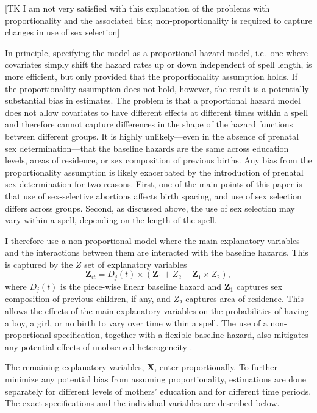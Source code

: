 \documentclass[12pt,letterpaper]{article}
\begin{document}
[TK I am not very satisfied with this explanation of the problems with
proportionality and the associated bias; non-proportionality is required
to capture changes in use of sex selection]

In principle, specifying the model as a proportional hazard model, i.e.\ one 
where covariates simply shift the hazard rates up or down independent of 
spell length, is more efficient, but only provided that the proportionality 
assumption holds.
If the proportionality assumption does not hold, however, the result is
a potentially substantial bias in estimates.
The problem is that a proportional hazard model does not allow covariates
to have different effects at different times within a spell and therefore
cannot capture differences in the shape of the hazard functions between 
different groups. 
It is highly unlikely---even in the absence of prenatal sex determination---that 
the baseline hazards are the same across education levels, areas of residence, 
or sex composition of previous births.
Any bias from the proportionality assumption is likely exacerbated by the 
introduction of prenatal sex determination for two reasons.
First, one of the main points of this paper is that use of sex-selective 
abortions affects birth spacing, and use of sex selection differs across groups.
Second, as discussed above, the use of sex selection may vary within a spell,
depending on the length of the spell.

I therefore use a non-proportional model where the main explanatory variables 
and the interactions between them are interacted with the baseline hazards.
This is captured by the $Z$ set of explanatory variables
\begin{equation}
 \mathbf{Z}_{it} = D_j(t) \times (\mathbf{Z}_1 + Z_2 + \mathbf{Z}_1 \times Z_2),
\end{equation}
where $D_j(t)$ is the piece-wise linear baseline hazard and $\mathbf{Z}_1$ captures sex 
composition of previous children, if any, and $Z_2$ captures area of residence.
This allows the effects of the main explanatory variables on the probabilities 
of having a boy, a girl, or no birth to vary over time within a spell.
The use of a non-proportional specification, together with a flexible baseline hazard, 
also mitigates any potential effects of unobserved heterogeneity \citep{Dolton1995}.

The remaining explanatory variables, $\mathbf{X}$, enter proportionally.
To further minimize any potential bias from assuming proportionality, estimations 
are done separately for different levels of mothers' education and for different 
time periods.
The exact specifications and the individual variables are described below.
\end{document}
